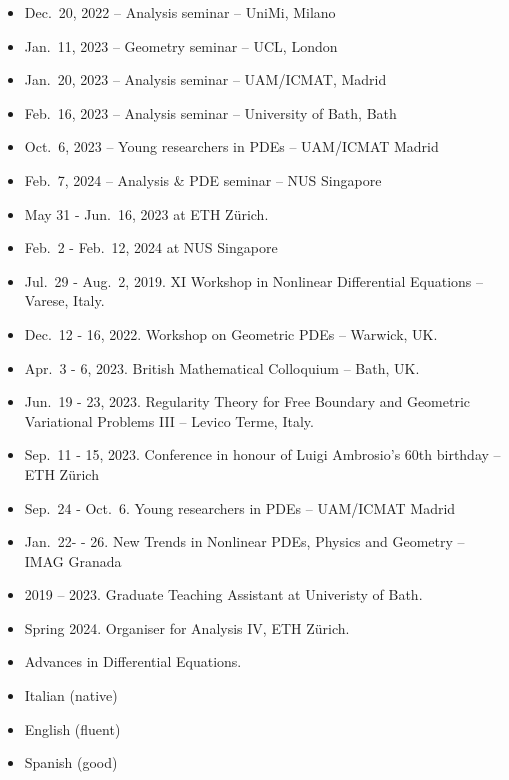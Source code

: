 \documentclass[12pt]{amsart}
\begin{document}
\bigskip\medskip
{}
\begin{itemize}
	\item {Dec.\ 20, 2022} -- Analysis seminar -- UniMi, Milano
	\item {Jan.\ 11, 2023} -- Geometry seminar -- UCL, London
	\item {Jan.\ 20, 2023} -- Analysis seminar -- UAM/ICMAT, Madrid 
	\item {Feb.\ 16, 2023} -- Analysis seminar -- University of Bath, Bath
	\item {Oct.\ 6, 2023} -- Young researchers in PDEs -- UAM/ICMAT Madrid
	\item {Feb.\ 7, 2024} -- Analysis \& PDE seminar -- NUS Singapore
\end{itemize}

\bigskip\medskip
{}
\begin{itemize}
	\item {May 31 - Jun.\ 16, 2023} at ETH Z\"urich.
	\item {Feb.\ 2 - Feb.\ 12, 2024} at NUS Singapore
\end{itemize}

\bigskip\medskip
{}
\begin{itemize}
	\item {Jul.\ 29 - Aug.\ 2, 2019}. XI Workshop in Nonlinear	 Differential Equations -- Varese, Italy. 
	\item {Dec.\ 12 - 16, 2022}. Workshop on Geometric PDEs -- Warwick, UK. 
	\item {Apr.\ 3 - 6, 2023}. British Mathematical Colloquium -- Bath, UK.
	\item {Jun.\ 19 - 23, 2023}. Regularity Theory for Free Boundary and Geometric Variational Problems III -- Levico Terme, Italy.
	\item {Sep.\ 11 - 15, 2023}. Conference in honour of Luigi Ambrosio's 60th birthday -- ETH Z\"urich
	\item {Sep.\ 24 - Oct.\ 6}. Young researchers in PDEs -- UAM/ICMAT Madrid
	\item {Jan.\ 22- - 26}. New Trends in Nonlinear PDEs, Physics and Geometry -- IMAG Granada
\end{itemize}

\bigskip\medskip
{}
\begin{itemize}
	\item 2019 -- 2023. Graduate Teaching Assistant at Univeristy of Bath. 
	\item Spring 2024. Organiser for Analysis IV, ETH Z\"urich.
\end{itemize}

\bigskip\medskip
{}
\begin{itemize}
	\item Advances in Differential Equations.
\end{itemize}

\bigskip\medskip
{}
\begin{itemize}
	\item Italian (native)
	\item English (fluent)
	\item Spanish (good) 
\end{itemize}
\end{document}
